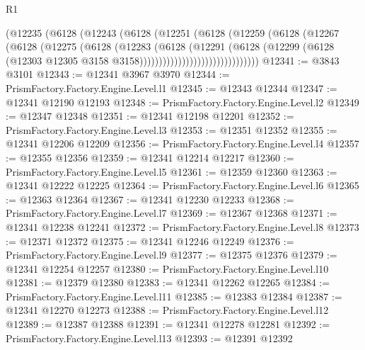 \begin{lexlean}{R1}
\begin{coremodule}
                            (@12235
                              (@6128
                                (@12243
                                  (@6128
                                    (@12251
                                      (@6128
                                        (@12259
                                          (@6128
                                            (@12267
                                              (@6128
                                                (@12275
                                                  (@6128
                                                    (@12283
                                                      (@6128
                                                        (@12291
                                                          (@6128
                                                            (@12299
                                                              (@6128
                                                                (@12303
                                                                  @12305
                                                                  @3158
                                                                  @3158)))))))))))))))))))))))))))))))
@12341 := @3843 @3101
@12343 := @12341 @3967 @3970
@12344 := PrismFactory.Factory.Engine.Level.l1
@12345 := @12343 @12344
@12347 := @12341 @12190 @12193
@12348 := PrismFactory.Factory.Engine.Level.l2
@12349 := @12347 @12348
@12351 := @12341 @12198 @12201
@12352 := PrismFactory.Factory.Engine.Level.l3
@12353 := @12351 @12352
@12355 := @12341 @12206 @12209
@12356 := PrismFactory.Factory.Engine.Level.l4
@12357 := @12355 @12356
@12359 := @12341 @12214 @12217
@12360 := PrismFactory.Factory.Engine.Level.l5
@12361 := @12359 @12360
@12363 := @12341 @12222 @12225
@12364 := PrismFactory.Factory.Engine.Level.l6
@12365 := @12363 @12364
@12367 := @12341 @12230 @12233
@12368 := PrismFactory.Factory.Engine.Level.l7
@12369 := @12367 @12368
@12371 := @12341 @12238 @12241
@12372 := PrismFactory.Factory.Engine.Level.l8
@12373 := @12371 @12372
@12375 := @12341 @12246 @12249
@12376 := PrismFactory.Factory.Engine.Level.l9
@12377 := @12375 @12376
@12379 := @12341 @12254 @12257
@12380 := PrismFactory.Factory.Engine.Level.l10
@12381 := @12379 @12380
@12383 := @12341 @12262 @12265
@12384 := PrismFactory.Factory.Engine.Level.l11
@12385 := @12383 @12384
@12387 := @12341 @12270 @12273
@12388 := PrismFactory.Factory.Engine.Level.l12
@12389 := @12387 @12388
@12391 := @12341 @12278 @12281
@12392 := PrismFactory.Factory.Engine.Level.l13
@12393 := @12391 @12392

\end{coremodule}
\end{lexlean}
